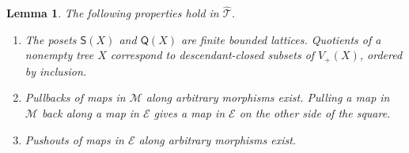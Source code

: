 \documentclass[11pt,a4paper]{article}
\theoremstyle{plain}
\newtheorem{lemma}[theorem]{Lemma}
\theoremstyle{definition}
\theoremstyle{remark}
\begin{document}
\begin{lemma}\label{lem:tree-lattice-calculus}
The following properties hold in $\widehat{\mathcal T}$.
\begin{enumerate}
\item The posets $\mathsf S(X)$ and $\mathsf Q(X)$ are finite
bounded lattices. Quotients of a nonempty tree $X$ correspond to
descendant-closed subsets of $V_+(X)$, ordered by inclusion.
\item Pullbacks of maps in $\mathcal M$ along arbitrary
morphisms exist. Pulling a map in $\mathcal M$ back along a
map in $\mathcal E$ gives a map in $\mathcal E$ on the other
side of the square.
\item Pushouts of maps in $\mathcal E$ along arbitrary
morphisms exist.
\end{enumerate}
\end{lemma}
\end{document}
